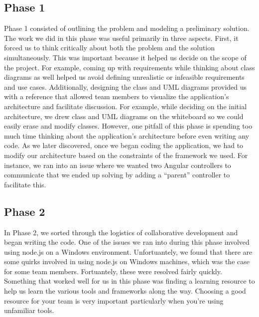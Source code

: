 \documentclass[letterpaper, 12pt]{article}
\begin{document}
\subsection{Phase 1}
Phase 1 consisted of outlining the problem and modeling a preliminary solution.  The work we did in this phase was useful primarily in three aspects. First, it forced us to think critically about both the problem and the solution simultaneously.  This was important because it helped us decide on the scope of the project.  For example, coming up with requirements while thinking about class diagrams as well helped us avoid defining unrealistic or infeasible requirements and use cases.  Additionally, designing the class and UML diagrams provided us with a reference that allowed team members to visualize the application's architecture and facilitate discussion. For example, while deciding on the initial architecture, we drew class and UML diagrams on the whiteboard so we could easily erase and modify classes.  However, one pitfall of this phase is spending too much time thinking about the application's architecture before even writing any code.  As we later discovered, once we began coding the application, we had to modify our architecture based on the constraints of the framework we used. For instance, we ran into an issue where we wanted two Angular controllers to communicate that we ended up solving by adding a ``parent'' controller to facilitate this.

\subsection{Phase 2}
In Phase 2, we sorted through the logistics of collaborative development and began writing the code. One of the issues we ran into during this phase involved using node.js on a Windows environment. Unfortuantely, we found that there are some quirks involved in using node.js on Windows machines, which was the case for some team members.  Fortuantely, these were resolved fairly quickly. Something that worked well for us in this phase was finding a learning resource to help us learn the various tools and frameworks along the way. Choosing a good resource for your team is very important particularly when you're using unfamiliar tools.
\end{document}
